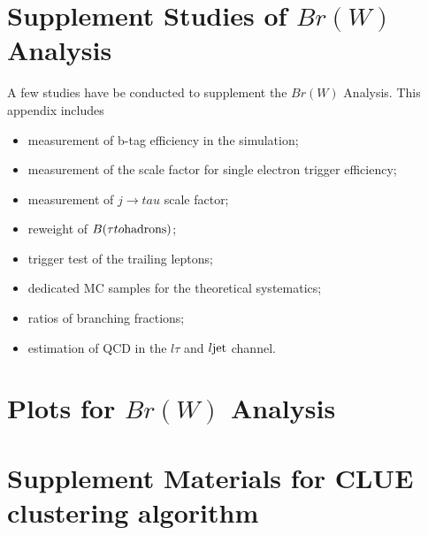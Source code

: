 \chapter{Supplement Studies of $Br(W)$ Analysis}

A few studies have be conducted to supplement the $Br(W)$ Analysis.
This appendix includes 
\begin{itemize}
    \item measurement of b-tag efficiency in the simulation;
    \item measurement of the scale factor for single electron trigger efficiency;
    \item measurement of $j \to tau$ scale factor;
    \item reweight of $B(\tau \to  \rm{hadrons})$;
    \item trigger test of the trailing leptons;
    \item dedicated MC samples for the \ttbar theoretical systematics;
    \item ratios of branching fractions;
    \item estimation of QCD in the $l\tau$ and $l\rm{jet}$ channel. 
\end{itemize}















\chapter{Plots for $Br(W)$ Analysis}





\chapter{Supplement Materials for CLUE clustering algorithm}

